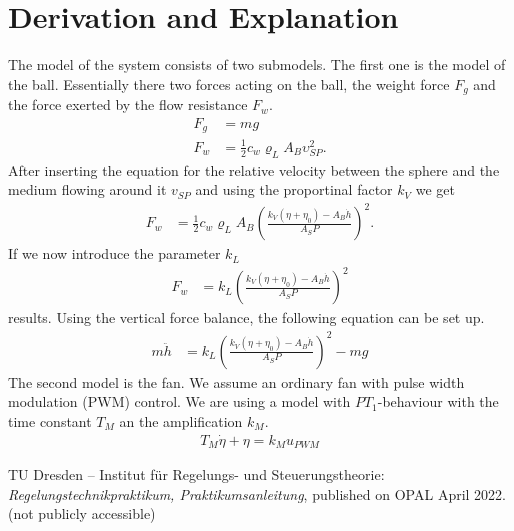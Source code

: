 \documentclass[10pt,a4paper]{article}
\begin{document}
	
	\section{Derivation and Explanation} %
	The model of the system consists of two submodels. The first one is the model of the ball. Essentially there two forces acting on the ball, the weight force $F_g$ and the force exerted by the flow resistance $F_w$.   
	\begin{align}
		F_g &= mg \\
		F_w &= \frac{1}{2} c_w \varrho_L A_B \upsilon_{SP}^2.
	\end{align}
	After inserting the equation for the relative velocity between the sphere and the medium flowing around it $v_{SP}$ and using the proportinal factor $k_V$ we get
	\begin{align}
		F_w &= \frac{1}{2} c_w \varrho_L A_B \left(\frac{k_V(\eta + \eta_0) - A_B \dot{h}}{A_SP}\right)^2.
	\end{align}
	If we now introduce the parameter $k_L$ 
	\begin{align}
		F_w &= k_L \left(\frac{k_V(\eta +\eta_0) - A_B\dot{h}}{A_SP}\right)^2
	\end{align} 
	results.
	Using the vertical force balance, the following equation can be set up.
	\begin{align}
		m\ddot{h}&= k_L \left(\frac{k_V(\eta +\eta_0) - A_B\dot{h}}{A_SP}\right)^2 -mg
	\end{align}
	The second model is the fan. We assume an ordinary fan with pulse width modulation (PWM) control. We are using a model with $PT_1$-behaviour with the time constant $T_M$ an the amplification $k_M$.
	\begin{align}
		T_M \dot{\eta} + \eta = k_Mu_{PWM}
	\end{align}    
	
	\begin{thebibliography}{10}		
		TU Dresden – Institut für Regelungs- und Steuerungstheorie: 
		\textit{Regelungstechnikpraktikum, Praktikumsanleitung}, published on OPAL April 2022. \\
		(not publicly accessible)
		
	\end{thebibliography}
\end{document}
